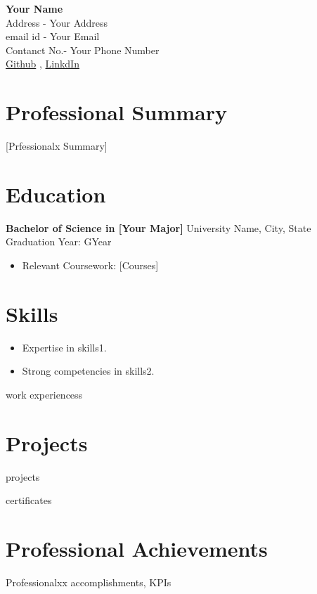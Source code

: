 \documentclass[a4paper,10pt]{article}
\newcommand{\resitem}[2]{
    \textbf{#1} \hfill {#2} \\
}
\begin{document}
\begin{center}
    {\LARGE \textbf{Your Name}} \\[0.2cm]
    Address - Your Address \\
    email id - Your Email \\
    Contanct No.-  Your Phone Number \\
    \href{https://github.com/Github Profile}{Github} , \href{https://www.linkedin.com/in/LinkedIn Profile}{LinkdIn}
\end{center}

\section*{Professional Summary}
[Prfessionalx Summary]

\section*{Education}
\resitem{Bachelor of Science in [Your Major]}{University Name, City, State \\ Graduation Year: GYear}
\begin{itemize}[left=0pt]
    \item Relevant Coursework: [Courses]
\end{itemize}

\section*{Skills}
\begin{itemize}
    \item Expertise in skills1.
    \item Strong competencies in skills2.
\end{itemize}

work experiencess

\section*{Projects}
projects

certificates

\section*{Professional Achievements}
Professionalxx accomplishments, KPIs
\end{document}

